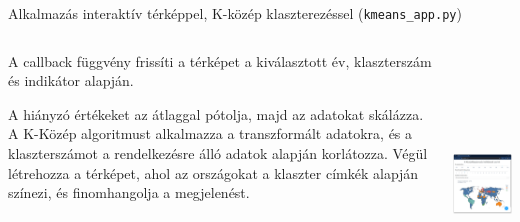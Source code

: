 \documentclass[english, aspectratio=169]{beamer}
\begin{document}
\begin{frame}{Alkalmazás interaktív térképpel, K-közép klaszterezéssel (\texttt{kmeans\_app.py})}
	\begin{columns}
		\begin{column}{.5\textwidth}
			A callback függvény frissíti a térképet a kiválasztott év, klaszterszám és indikátor alapján.\par\smallskip
			A hiányzó értékeket az átlaggal pótolja, majd az adatokat skálázza. A K-Közép algoritmust alkalmazza a transzformált adatokra, és a klaszterszámot a rendelkezésre álló adatok alapján korlátozza. Végül létrehozza a térképet, ahol az országokat a klaszter címkék alapján színezi, és finomhangolja a megjelenést.
		\end{column}
		\begin{column}{.5\textwidth}
			\begin{center}
				\includegraphics[width=7cm, height=7cm, keepaspectratio]{images/freq_19.png}
			\end{center}
		\end{column}
	\end{columns}
\end{frame}
\end{document}
